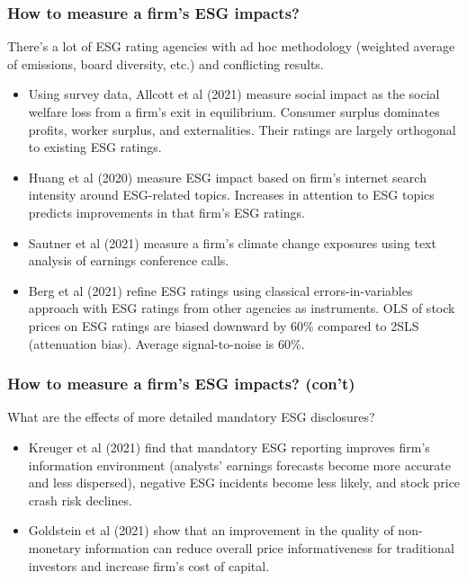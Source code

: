\documentclass[handout]{beamer}
\begin{document}
\begin{frame}
\frametitle{How to measure a firm's ESG impacts?}
There's a lot of ESG rating agencies with ad hoc methodology (weighted average of emissions, board diversity, etc.) and conflicting results.
\bigskip
\begin{itemize}[<+->]
\item Using survey data, Allcott et al (2021) measure social impact as the social welfare loss from a firm's exit in equilibrium. Consumer surplus dominates profits, worker surplus, and externalities. Their ratings are largely orthogonal to existing ESG ratings.
\bigskip
\item Huang et al (2020) measure ESG impact based on firm's internet search intensity around ESG-related topics. Increases in attention to ESG topics predicts
improvements in that firm's ESG ratings.
\bigskip
\item Sautner et al (2021) measure a firm's climate change exposures using text analysis of earnings conference calls.
\bigskip
\item Berg et al (2021) refine ESG ratings using classical errors-in-variables approach with ESG ratings from other agencies as instruments. OLS of stock prices on ESG ratings are biased downward by 60\% compared to 2SLS (attenuation bias). Average signal-to-noise is 60\%.
\end{itemize}
\end{frame}



\begin{frame}
\frametitle{How to measure a firm's ESG impacts? (con't)} 
What are the effects of more detailed mandatory ESG disclosures?
\bigskip
\begin{itemize}[<+->]
\item Kreuger et al (2021) find that mandatory ESG reporting improves firm's information
environment (analysts' earnings forecasts become more accurate and less dispersed), negative ESG incidents become less likely, and stock price crash risk declines.
\bigskip
\item Goldstein et al (2021) show that an improvement in
the quality of non-monetary information can reduce overall price informativeness for traditional investors
and increase firm's cost of capital. 
\end{itemize}
\end{frame}
\end{document}
